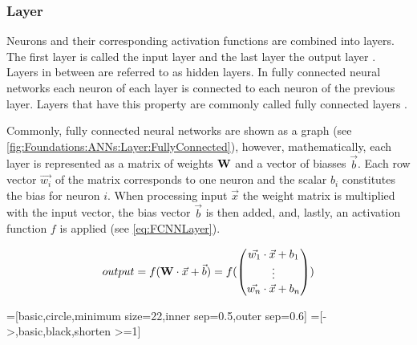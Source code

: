 \subsubsection{Layer}
\label{sec:Foundations:NeuralNetworks:Layer}

Neurons and their corresponding activation functions are combined into layers. The first layer is called the input layer and the last layer the output layer \cite{nielsen2015neural}. Layers in between are referred to as hidden layers. In fully connected neural networks  each neuron of each layer is connected to each neuron of the previous layer. Layers that have this property are commonly called fully connected layers . 

Commonly, fully connected neural networks are shown as a graph (see \autoref{fig:Foundations:ANNs:Layer:FullyConnected}), however, mathematically, each layer is represented as a matrix of weights $\mathbf{W}$ and a vector of biasses $\vec{b}$. Each row vector $\vec{w_i}$ of the matrix corresponds to one neuron and the scalar $b_i$ constitutes the bias for neuron $i$. When processing input $\vec{x}$ the weight matrix is multiplied with the input vector, the bias vector $\vec{b}$ is then added, and, lastly, an activation function $f$ is applied (see \autoref{eq:FCNNLayer}).

\begin{equation}
    \label{eq:FCNNLayer}
    output = f(\mathbf{W} \cdot \vec{x} + \vec{b}) = f( \begin{pmatrix}
        \vec{w_1} \cdot \vec{x} + b_1\\
        \vdots \\
        \vec{w_n} \cdot \vec{x} + b_n
      \end{pmatrix} )
\end{equation}

\tikzset{>=latex} %
=[basic,circle,minimum size=22,inner sep=0.5,outer sep=0.6]
=[->,basic,black,shorten >=1]
\def\nstyle{int(\lay<\Nnodlen?min(2,\lay):3)} %

